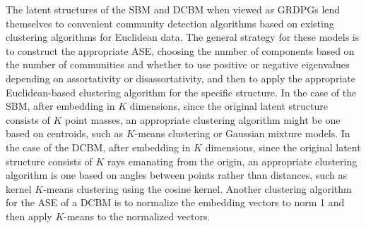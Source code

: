 \documentclass[
  12pt,
]{article}
\theoremstyle{definition}
\theoremstyle{definition}
\theoremstyle{definition}
\theoremstyle{definition}
\theoremstyle{remark}
\begin{document}
The latent structures of the SBM and DCBM when viewed as GRDPGs lend themselves to convenient community detection algorithms based on existing clustering algorithms for Euclidean data.
The general strategy for these models is to construct the appropriate ASE, choosing the number of components based on the number of communities and whether to use positive or negative eigenvalues depending on assortativity or disassortativity, and then to apply the appropriate Euclidean-based clustering algorithm for the specific structure.
In the case of the SBM, after embedding in \(K\) dimensions, since the original latent structure consists of \(K\) point masses, an appropriate clustering algorithm might be one based on centroids, such as \(K\)-means clustering or Gaussian mixture models.
In the case of the DCBM, after embedding in \(K\) dimensions, since the original latent structure consists of \(K\) rays emanating from the origin, an appropriate clustering algorithm is one based on angles between points rather than distances, such as kernel \(K\)-means clustering using the cosine kernel.
Another clustering algorithm for the ASE of a DCBM is to normalize the embedding vectors to norm 1 and then apply \(K\)-means to the normalized vectors.
\end{document}

